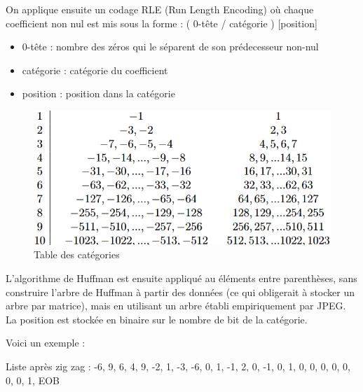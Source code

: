 \documentclass{article}
\begin{document}
\hfill
\begin{minipage}{0.47\textwidth}
    On applique ensuite un codage RLE (Run Length Encoding) où chaque coefficient non nul est mis sous la forme : ( 0-tête / catégorie ) [position]
    \begin{itemize}
        \item 0-tête : nombre des zéros qui le séparent de son prédecesseur non-nul 
        \item catégorie : catégorie du coefficient
        \item position : position dans la catégorie
    \end{itemize}
\end{minipage}
\hfill
\begin{minipage}{0.43\textwidth}
    \begin{figure}[H]
        \centering
        \includegraphics[width=1\linewidth]{categorie.png}
        \caption{Table des catégories}
    \end{figure}
\end{minipage}
\hfill

\vspace{.8cm} 

L'algorithme de Huffman est ensuite appliqué au éléments entre parenthèses, sans construire l'arbre de Huffman à partir des données (ce qui obligerait à stocker un arbre par matrice), mais en utilisant un arbre établi empiriquement par JPEG. La position est stockée en binaire sur le nombre de bit de la catégorie.

\vspace{.3cm} 

Voici un exemple :

\vspace{.3cm} 

Liste après zig zag : -6, 9, 6, 4, 9, -2, 1, -3, -6, 0, 1, -1, 2, 0, -1, 0, 1, 0, 0, 0, 0, 0, 0, 0, 1, EOB 

\vspace{.3cm} 
\end{document}
